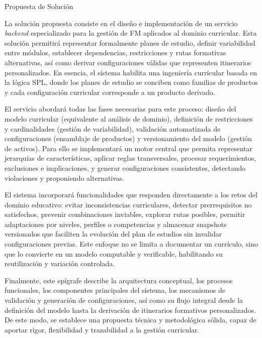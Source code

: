 \epigraph{Propuesta de Solución}{

    La solución propuesta consiste en el diseño e implementación de un servicio  
    \textit{backend} especializado para la gestión de \ac{FM} 
    aplicados al dominio curricular. Esta solución 
    permitirá representar formalmente planes de estudio, definir variabilidad 
    entre módulos, establecer dependencias, restricciones y rutas formativas 
    alternativas, así como derivar configuraciones válidas que representen 
    itinerarios personalizados. En esencia, el sistema habilita una ingeniería 
    curricular basada en la lógica \ac{SPL}, donde los 
    planes de estudio se conciben como familias de productos y cada 
    configuración curricular corresponde a un producto derivado.

    El servicio abordará todas las fases necesarias para este proceso: 
    diseño del modelo curricular (equivalente al análisis de dominio), definición 
    de restricciones y cardinalidades (gestión de variabilidad), 
    validación automatizada de configuraciones (ensamblaje de productos) y 
    versionamiento del modelo (gestión de activos). Para ello se implementará 
    un motor central que permita representar jerarquías de características, 
    aplicar reglas transversales, procesar requerimientos, exclusiones e 
    implicaciones, y generar configuraciones consistentes, detectando violaciones 
    y proponiendo alternativas.

    El sistema incorporará funcionalidades que responden directamente a los 
    retos del dominio educativo: evitar inconsistencias curriculares, detectar 
    prerrequisitos no satisfechos, prevenir combinaciones inviables, 
    explorar rutas posibles, permitir adaptaciones por niveles, perfiles o 
    competencias y almacenar snapshots versionados que faciliten la evolución 
    del plan de estudios sin invalidar configuraciones previas. Este enfoque 
    no se limita a documentar un currículo, sino que lo convierte en un modelo 
    computable y verificable, habilitando su reutilización y variación controlada.

    Finalmente, este epígrafe describe la arquitectura conceptual, los procesos 
    funcionales, los componentes principales del sistema, los mecanismos de 
    validación y generación de configuraciones, así como su flujo integral desde 
    la definición del modelo hasta la derivación de itinerarios formativos 
    personalizados. De este modo, se establece una propuesta técnica y 
    metodológica sólida, capaz de aportar rigor, flexibilidad y trazabilidad 
    a la gestión curricular.

}
